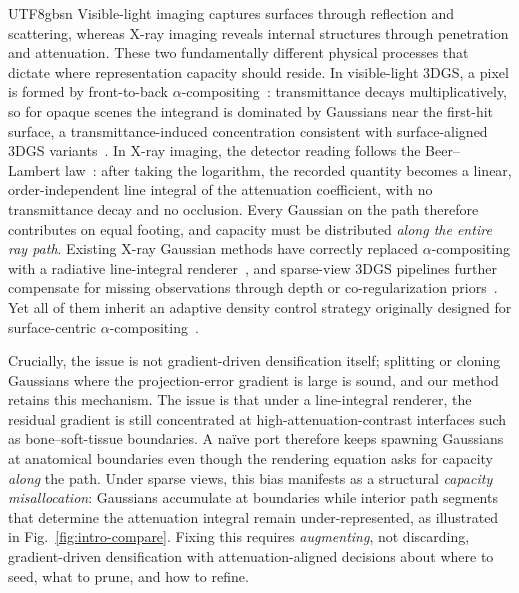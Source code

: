 \documentclass{egpubl}
\begin{document}
\begin{CJK*}{UTF8}{gbsn}
Visible-light imaging captures surfaces through reflection and scattering, whereas X-ray imaging reveals internal structures through penetration and attenuation. These two fundamentally different physical processes that dictate where representation capacity should reside. In visible-light 3DGS, a pixel is formed by front-to-back $\alpha$-compositing~\cite{kerbl20233d,max1995optical}: transmittance decays multiplicatively, so for opaque scenes the integrand is dominated by Gaussians near the first-hit surface, a transmittance-induced concentration consistent with surface-aligned 3DGS variants~\cite{guedon2024sugar,huang20242dgs}. In X-ray imaging, the detector reading follows the Beer--Lambert law~\cite{kak2001principles}: after taking the logarithm, the recorded quantity becomes a linear, order-independent line integral of the attenuation coefficient, with no transmittance decay and no occlusion. Every Gaussian on the path therefore contributes on equal footing, and capacity must be distributed \emph{along the entire ray path}. Existing X-ray Gaussian methods have correctly replaced $\alpha$-compositing with a radiative line-integral renderer~\cite{cai2024xgaussian,hu2024r2,xfield2025,dgr2025}, and sparse-view 3DGS pipelines further compensate for missing observations through depth or co-regularization priors~\cite{zhu2024fsgs,zhang2024cor,li2024dn}. Yet all of them inherit an adaptive density control strategy originally designed for surface-centric $\alpha$-compositing~\cite{kerbl20233d,roessle2024densification}.

Crucially, the issue is not gradient-driven densification itself; splitting or cloning Gaussians where the projection-error gradient is large is sound, and our method retains this mechanism. The issue is that under a line-integral renderer, the residual gradient is still concentrated at high-attenuation-contrast interfaces such as bone--soft-tissue boundaries. A na\"ive port therefore keeps spawning Gaussians at anatomical boundaries even though the rendering equation asks for capacity \emph{along} the path. Under sparse views, this bias manifests as a structural \emph{capacity misallocation}: Gaussians accumulate at boundaries while interior path segments that determine the attenuation integral remain under-represented, as illustrated in Fig.~\ref{fig:intro-compare}. Fixing this requires \emph{augmenting}, not discarding, gradient-driven densification with attenuation-aligned decisions about where to seed, what to prune, and how to refine.


\end{CJK*}
\end{document}
